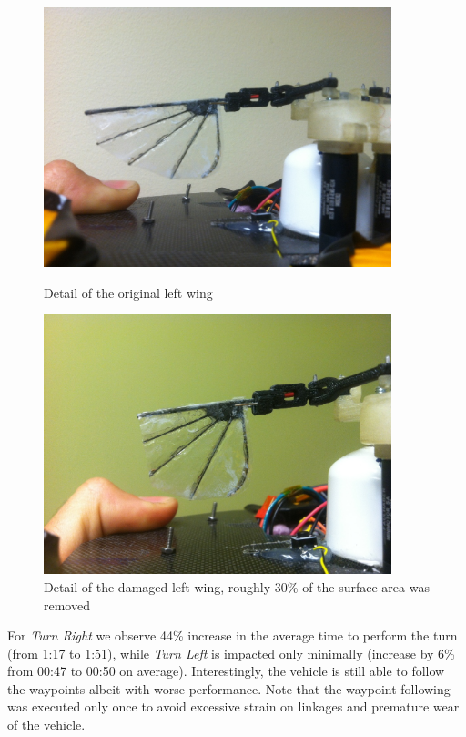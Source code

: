 \begin{figure}
\centering
{}
\includegraphics[width=0.9\textwidth]{Files/Figures/photo3.JPG}
\caption[Original Wing]{Detail of the original left wing \newline \newline \newline}
\label{fig:original-wing}
\endminipage\hfill
{}
\includegraphics[width=0.9\textwidth]{Files/Figures/photo4.JPG}
\caption[Damaged wing]{Detail of the damaged left wing, roughly 30\% of the surface area was removed \newline}
\label{fig:damaged-wing-detail}
\endminipage\hfill
\end{figure}

For \textit{Turn Right} we observe 44\% increase in the average time to perform the turn (from 1:17 to 1:51), while \textit{Turn Left} is impacted only minimally (increase by 6\% from 00:47 to 00:50 on average). Interestingly, the vehicle is still able to follow the waypoints albeit with worse performance. Note that the waypoint following was executed only once to avoid excessive strain on linkages and premature wear of the vehicle.


